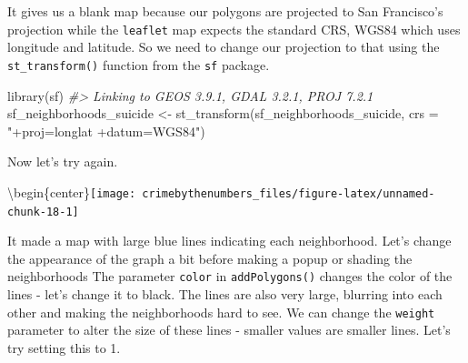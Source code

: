 \documentclass[
]{krantz}
\makeatletter
\newenvironment{Shaded}{\begin{snugshade}}{\end{snugshade}}
\newcommand{\AttributeTok}[1]{\textcolor[rgb]{0.61,0.61,0.61}{#1}}
\newcommand{\CommentTok}[1]{\textcolor[rgb]{0.37,0.37,0.37}{\textit{#1}}}
\newcommand{\FunctionTok}[1]{\textcolor[rgb]{0,0,0}{#1}}
\newcommand{\NormalTok}[1]{#1}
\newcommand{\OtherTok}[1]{\textcolor[rgb]{0.37,0.37,0.37}{#1}}
\newcommand{\SpecialCharTok}[1]{\textcolor[rgb]{0,0,0}{#1}}
\newcommand{\StringTok}[1]{\textcolor[rgb]{0.5,0.5,0.5}{#1}}
\newenvironment{kframe}{%
\medskip{}
\setlength{\fboxsep}{.8em}
 \def\at@end@of@kframe{}%
 \ifinner\ifhmode%
  \def\at@end@of@kframe{\end{minipage}}%
  \begin{minipage}{\columnwidth}%
 \fi\fi%
 \def\FrameCommand##1{\hskip\@totalleftmargin \hskip-\fboxsep
 \colorbox{shadecolor}{##1}\hskip-\fboxsep
     \hskip-\linewidth \hskip-\@totalleftmargin \hskip\columnwidth}%
 \MakeFramed {\advance\hsize-\width
   \@totalleftmargin\z@ \linewidth\hsize
   \@setminipage}}%
 {\par\unskip\endMakeFramed%
 \at@end@of@kframe}
\renewenvironment{Shaded}{\begin{kframe}}{\end{kframe}}
\makeatother
\begin{document}
It gives us a blank map because our polygons are projected to San Francisco's projection while the \texttt{leaflet} map expects the standard CRS, WGS84 which uses longitude and latitude. So we need to change our projection to that using the \texttt{st\_transform()} function from the \texttt{sf} package.

\begin{Shaded}
\begin{Highlighting}[]
\FunctionTok{library}\NormalTok{(sf)}
\CommentTok{\#\textgreater{} Linking to GEOS 3.9.1, GDAL 3.2.1, PROJ 7.2.1}
\NormalTok{sf\_neighborhoods\_suicide }\OtherTok{\textless{}{-}} \FunctionTok{st\_transform}\NormalTok{(sf\_neighborhoods\_suicide,}
  \AttributeTok{crs =} \StringTok{"+proj=longlat +datum=WGS84"}\NormalTok{)}
\end{Highlighting}
\end{Shaded}

Now let's try again.

\begin{Shaded}
\end{Shaded}

\textbackslash begin\{center\}\texttt{[image: crimebythenumbers\_files/figure-latex/unnamed-chunk-18-1]}

It made a map with large blue lines indicating each neighborhood. Let's change the appearance of the graph a bit before making a popup or shading the neighborhoods The parameter \texttt{color} in \texttt{addPolygons()} changes the color of the lines - let's change it to black. The lines are also very large, blurring into each other and making the neighborhoods hard to see. We can change the \texttt{weight} parameter to alter the size of these lines - smaller values are smaller lines. Let's try setting this to 1.
\end{document}
